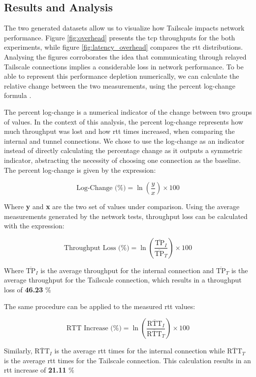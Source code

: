 \documentclass[11pt,twoside,a4paper]{report}
\begin{document}
\subsection{Results and Analysis}

The two generated datasets allow us to visualize how Tailscale impacts network performance. Figure \ref{fig:overhead} presents the \ac{tcp} throughputs for the both experiments, while figure \ref{fig:latency_overhead} compares the \ac{rtt} distributions. Analysing the figures corroborates the idea that communicating through relayed Tailscale connections implies a considerable loss in network performance. To be able to represent this performance depletion numerically, we can calculate the relative change between the two measurements, using the percent log-change formula \cite{tornqvist1985should}.

The percent log-change is a numerical indicator of the change between two groups of values. In the context of this analysis, the percent log-change represents how much throughput was lost and how \ac{rtt} times increased, when comparing the internal and tunnel connections. We chose to use the log-change as an indicator instead of directly calculating the percentage change as it outputs a symmetric indicator, abstracting the necessity of choosing one connection as the baseline. The percent log-change is given by the expression:

\[
\text{Log-Change (\%)} = \ln\left(\frac{y}{x}\right) \times 100
\]

Where \textbf{y} and \textbf{x} are the two set of values under comparison. Using the average measurements generated by the network tests, throughput loss can be calculated with the expression:

\[
\text{Throughput Loss (\%)} = \ln\left(\frac{\overline{\text{TP}}_I}{\overline{\text{TP}}_T}\right) \times 100
\]

Where \textbf{ \( \overline{\text{TP}}_I \)} is the average throughput for the internal connection and \textbf{\( \overline{\text{TP}}_T \)} is the average throughput for the Tailscale connection, which results in a throughput loss of \textbf{46.23} \%

The same procedure can be applied to the measured \ac{rtt} values:

\[
\text{RTT Increase (\%)} = \ln\left(\frac{\overline{\text{RTT}}_I}{\overline{\text{RTT}}_T}\right) \times 100
\]

Similarly, \textbf{ \( \overline{\text{RTT}}_I \)} is the average \ac{rtt} times for the internal connection while \textbf{\( \overline{\text{RTT}}_T \)} is the average \ac{rtt} times for the Tailscale connection. This calculation results in an \ac{rtt} increase of \textbf{21.11} \%
\end{document}
